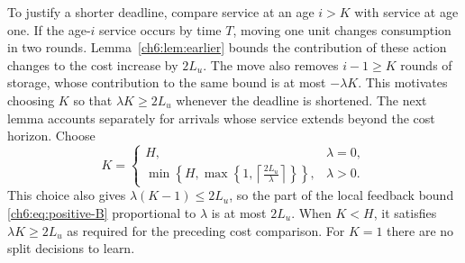 \documentclass[11pt]{article}
\theoremstyle{plain}
\theoremstyle{remark}
\numberwithin{equation}{section}
\begin{document}
To justify a shorter deadline, compare service at an age $i>K$ with
service at age one. If the age-$i$ service occurs by time $T$, moving one
unit changes consumption in two rounds. Lemma~\ref{ch6:lem:earlier} bounds
the contribution of these action changes to the cost increase by $2L_u$.
The move also removes $i-1\ge K$ rounds of storage, whose contribution to
the same bound is at most $-\lambda K$. This motivates choosing $K$ so
that $\lambda K\ge2L_u$ whenever the deadline is shortened. The next lemma
accounts separately for arrivals whose service extends beyond the cost
horizon. Choose
\begin{equation}\label{ch6:eq:K}
 K=\begin{cases}
 H,&\lambda=0,\\[1mm]
 \displaystyle\min\left\{H,
 \max\left\{1,\left\lceil\frac{2L_u}{\lambda}\right\rceil\right\}\right\},
 &\lambda>0.
 \end{cases}
\end{equation}
This choice also gives $\lambda(K-1)\le2L_u$, so the part of the local
feedback bound \eqref{ch6:eq:positive-B} proportional to $\lambda$ is at
most $2L_u$. When $K<H$, it satisfies
$\lambda K\ge2L_u$ as required for the preceding cost comparison.
For $K=1$ there are no split decisions to learn.
\end{document}
